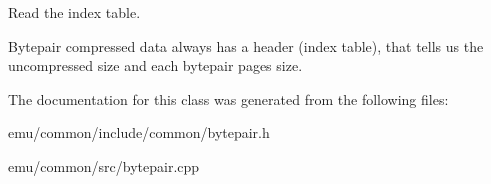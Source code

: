 Read the index table. 

Bytepair compressed data always has a header (index table), that tells us the uncompressed size and each bytepair page\textquotesingle{}s size. 

The documentation for this class was generated from the following files\+:\begin{DoxyCompactItemize}
\item 
emu/common/include/common/bytepair.\+h\item 
emu/common/src/bytepair.\+cpp\end{DoxyCompactItemize}
